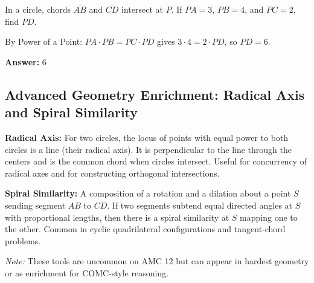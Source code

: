 \documentclass[12pt]{article}
\newenvironment{problem}[1]
{\begin{tcolorbox}[colback=blue!5!white,colframe=blue!75!black,title={#1}]}{\end{tcolorbox}}
\newenvironment{solution}
{\begin{tcolorbox}[colback=green!5!white,colframe=green!75!black,title={Solution}]}{\end{tcolorbox}}
\begin{document}
\begin{center}
\end{center}

\begin{problem}{Example: Intersecting Chords}
In a circle, chords $\overline{AB}$ and $\overline{CD}$ intersect at $P$. If $PA = 3$, $PB = 4$, and $PC = 2$, find $PD$.
\end{problem}

\begin{solution}
By Power of a Point: $PA\cdot PB = PC\cdot PD$ gives $3\cdot 4 = 2\cdot PD$, so $PD = 6$.

\textbf{Answer:} $6$
\end{solution}

\subsection*{Advanced Geometry Enrichment: Radical Axis and Spiral Similarity}
\textbf{Radical Axis:} For two circles, the locus of points with equal power to both circles is a line (their radical axis). It is perpendicular to the line through the centers and is the common chord when circles intersect. Useful for concurrency of radical axes and for constructing orthogonal intersections.

\textbf{Spiral Similarity:} A composition of a rotation and a dilation about a point $S$ sending segment $AB$ to $CD$. If two segments subtend equal directed angles at $S$ with proportional lengths, then there is a spiral similarity at $S$ mapping one to the other. Common in cyclic quadrilateral configurations and tangent-chord problems.

\textit{Note:} These tools are uncommon on AMC 12 but can appear in hardest geometry or as enrichment for COMC-style reasoning.
\end{document}

